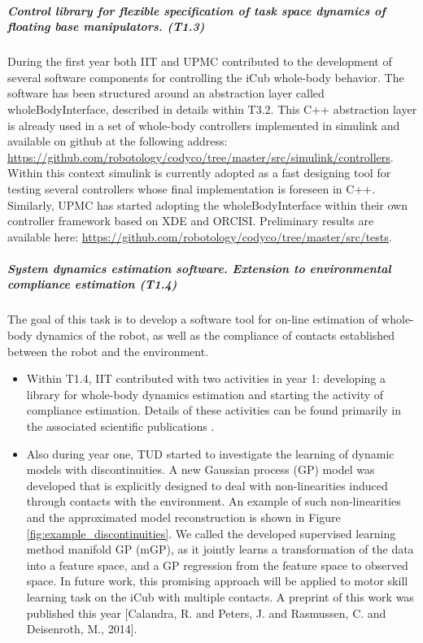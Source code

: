 \documentclass[12pt,a4paper,twoside]{article}
\begin{document}
\subparagraph{Control library for flexible specification of task space dynamics of floating base manipulators. (T1.3)}

During the first year both IIT and UPMC contributed to the development of several software components for controlling the iCub whole-body behavior. The software has been structured around an abstraction layer called wholeBodyInterface, described in details within T3.2. This C++ abstraction layer is already used in a set of whole-body controllers implemented in simulink and available on github at the following address: \url{https://github.com/robotology/codyco/tree/master/src/simulink/controllers}. Within this context simulink is currently adopted as a fast designing tool for testing several controllers whose final implementation is foreseen in C++. Similarly, UPMC has started adopting the wholeBodyInterface within their own
controller framework based on XDE and ORCISI. Preliminary results are available here: \url{https://github.com/robotology/codyco/tree/master/src/tests}. 

\subparagraph{System dynamics estimation software. Extension to
environmental compliance estimation (T1.4)}

The goal of this task is to develop a software tool for on-line estimation of whole-body dynamics of the robot, as well as the compliance of contacts established between the robot and the environment. 

\begin{itemize}
\item Within T1.4, IIT contributed with two activities in year 1: developing a library for whole-body dynamics estimation and starting the activity of compliance estimation. Details of these activities can be found primarily in the associated scientific publications \cite{Traversaro2013, Traversaro2014, Fiorio2014}.

\item Also during year one, TUD started to investigate the learning of dynamic models with
discontinuities. A new Gaussian process (GP) model was developed
that is explicitly designed to deal with non-linearities
induced through contacts with the environment. An example of such non-linearities 
and the approximated model reconstruction is shown in Figure \ref{fig:example_discontinuities}.
We called the developed supervised learning method manifold GP (mGP), as it 
jointly learns a transformation of the data into a feature space, and a GP regression 
 from the feature space to observed space. In future work, this promising approach 
 will be applied to motor skill learning task on the iCub with multiple contacts. 
 A preprint of this work 
 was published this year [Calandra, R. and Peters, J. and Rasmussen, C. and Deisenroth,
M., 2014].
\end{itemize}
\end{document}
